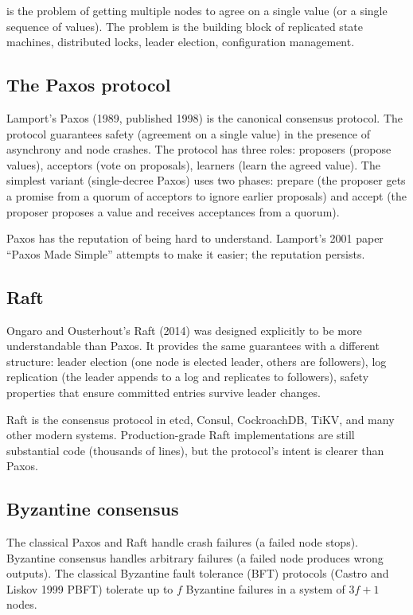  is the problem of getting multiple nodes to agree on a single value (or a single sequence of values). The problem is the building block of replicated state machines, distributed locks, leader election, configuration management.

\subsection{The Paxos protocol}

Lamport's Paxos (1989, published 1998) is the canonical consensus protocol. The protocol guarantees safety (agreement on a single value) in the presence of asynchrony and node crashes. The protocol has three roles: proposers (propose values), acceptors (vote on proposals), learners (learn the agreed value). The simplest variant (single-decree Paxos) uses two phases: prepare (the proposer gets a promise from a quorum of acceptors to ignore earlier proposals) and accept (the proposer proposes a value and receives acceptances from a quorum).

Paxos has the reputation of being hard to understand. Lamport's 2001 paper ``Paxos Made Simple'' attempts to make it easier; the reputation persists.

\subsection{Raft}

Ongaro and Ousterhout's Raft (2014) was designed explicitly to be more understandable than Paxos. It provides the same guarantees with a different structure: leader election (one node is elected leader, others are followers), log replication (the leader appends to a log and replicates to followers), safety properties that ensure committed entries survive leader changes.

Raft is the consensus protocol in etcd, Consul, CockroachDB, TiKV, and many other modern systems. Production-grade Raft implementations are still substantial code (thousands of lines), but the protocol's intent is clearer than Paxos.

\subsection{Byzantine consensus}

The classical Paxos and Raft handle crash failures (a failed node stops). Byzantine consensus handles arbitrary failures (a failed node produces wrong outputs). The classical Byzantine fault tolerance (BFT) protocols (Castro and Liskov 1999 PBFT) tolerate up to $f$ Byzantine failures in a system of $3f + 1$ nodes.


